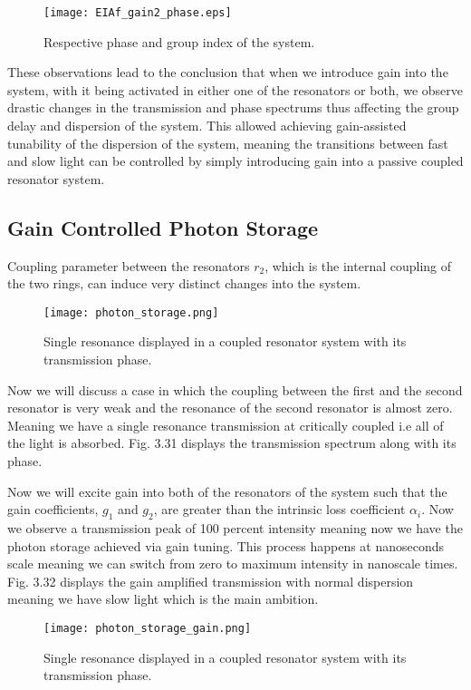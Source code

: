 \begin{figure}[h]
\centering
\texttt{[image: EIAf\_gain2\_phase.eps]}
\caption{Respective phase and group index of the system.}
\end{figure}

These observations lead to the conclusion that when we introduce gain into the system, with it being activated in either one of the resonators or both, we observe drastic changes in the transmission and phase spectrums thus affecting the group delay and dispersion of the system. This allowed achieving gain-assisted tunability of the dispersion of the system, meaning the transitions between fast and slow light can be controlled by simply introducing gain into a passive coupled resonator system.

\subsection{Gain Controlled Photon Storage}
Coupling parameter between the resonators $r_{2}$, which is the internal coupling of the two rings, can induce very distinct changes into the system.

\begin{figure}[h]
\centering 
\texttt{[image: photon\_storage.png]}
\caption{Single resonance displayed in a coupled resonator system with its transmission phase.}
\end{figure}

Now we will discuss a case in which the coupling between the first and the second resonator is very weak and the resonance of the second resonator is almost zero. Meaning we have a single resonance transmission at critically coupled i.e all of the light is absorbed. Fig. 3.31 displays the transmission spectrum along with its phase. 

Now we will excite gain into both of the resonators of the system such that the gain  coefficients, $g_{1}$ and $g_{2}$, are greater than the intrinsic loss coefficient $\alpha_{i}$. Now we observe a transmission peak of 100 percent intensity meaning now we have the photon storage achieved via gain tuning. This process happens at nanoseconds scale meaning we can switch from zero to maximum intensity in nanoscale times. Fig. 3.32 displays the gain amplified transmission with normal dispersion meaning we have slow light which is the main ambition.

\begin{figure}[h]
\centering 
\texttt{[image: photon\_storage\_gain.png]}
\caption{Single resonance displayed in a coupled resonator system with its transmission phase.}
\end{figure}

